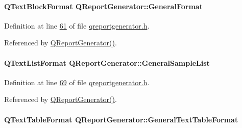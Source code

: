 \paragraph[{General\+Format}]{\setlength{\rightskip}{0pt plus 5cm}Q\+Text\+Block\+Format Q\+Report\+Generator\+::\+General\+Format\hspace{0.3cm}{\ttfamily [private]}}\label{class_q_report_generator_a9a18bc94ca92a730ae0f13d60a6b5e0a}


Definition at line \hyperlink{qreportgenerator_8h_source_l00061}{61} of file \hyperlink{qreportgenerator_8h_source}{qreportgenerator.\+h}.



Referenced by \hyperlink{qreportgenerator_8cpp_source_l00004}{Q\+Report\+Generator()}.

\hypertarget{class_q_report_generator_a415a4b3a8995d02b724156b5e9c14486}{}
\paragraph[{General\+Sample\+List}]{\setlength{\rightskip}{0pt plus 5cm}Q\+Text\+List\+Format Q\+Report\+Generator\+::\+General\+Sample\+List\hspace{0.3cm}{\ttfamily [private]}}\label{class_q_report_generator_a415a4b3a8995d02b724156b5e9c14486}


Definition at line \hyperlink{qreportgenerator_8h_source_l00069}{69} of file \hyperlink{qreportgenerator_8h_source}{qreportgenerator.\+h}.



Referenced by \hyperlink{qreportgenerator_8cpp_source_l00004}{Q\+Report\+Generator()}.

\hypertarget{class_q_report_generator_afcb27e52bd15a286a1933c3b9cf01c92}{}
\paragraph[{General\+Text\+Table\+Format}]{\setlength{\rightskip}{0pt plus 5cm}Q\+Text\+Table\+Format Q\+Report\+Generator\+::\+General\+Text\+Table\+Format\hspace{0.3cm}{\ttfamily [private]}}\label{class_q_report_generator_afcb27e52bd15a286a1933c3b9cf01c92}


